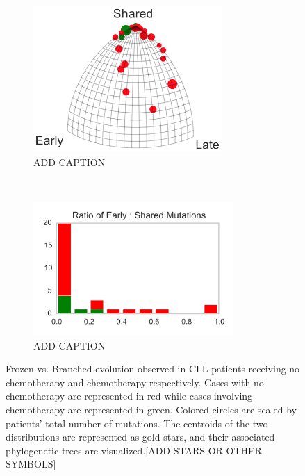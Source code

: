 \documentclass[a4paper,11pt]{article}
\begin{document}
\begin{figure}
    \begin{subfigure}{0.5\linewidth}
    \centering
    \includegraphics[height=2.2in]{figures/CLL_triplet.png}
    \caption{ADD CAPTION}
    \label{CLL}
    \end{subfigure}
    ~
    \begin{subfigure}{0.5\linewidth}
    \centering
    \includegraphics[height=2in]{figures/CLL_histogram.pdf}
    \caption{ADD CAPTION}
    \end{subfigure}

    \caption{Frozen vs. Branched evolution observed in CLL patients receiving no chemotherapy and chemotherapy respectively. Cases with no chemotherapy are represented in red while cases involving chemotherapy are represented in green. Colored circles are scaled by patients' total number of mutations. The centroids of the two distributions are represented as gold stars, and their associated phylogenetic trees are visualized.[ADD STARS OR OTHER SYMBOLS]}
    \label{fig:chemoCLL}
\end{figure}
\end{document}
